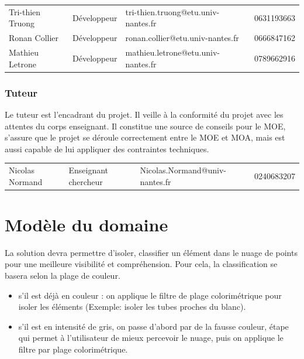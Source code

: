 \documentclass[12pt,titlepage,french]{article}
\begin{document}
\noindent\begin{tabu} to \textwidth {X[c2]X[c]X[c3]X[c]}\toprule
     &&                       &\\\toprule
Tri-thien Truong& Développeur&tri-thien.truong@etu.univ-nantes.fr&    0631193663\\\midrule
   Ronan Collier& Développeur&   ronan.collier@etu.univ-nantes.fr&    0666847162\\\midrule
 Mathieu Letrone& Développeur& mathieu.letrone@etu.univ-nantes.fr&    0789662916\\\bottomrule
\end{tabu}


\subsubsection*{Tuteur}

Le tuteur est l'encadrant du projet. Il veille à la conformité du projet avec les attentes du corps enseignant.
Il constitue une source de conseils pour le MOE, s'assure que le projet se déroule correctement entre le MOE et MOA, mais est aussi capable de lui appliquer des contraintes techniques.\\ 

\noindent\begin{tabu} to \textwidth {X[c2]X[c2]X[c3]X[c]}\toprule
     &&                       &\\\toprule
Nicolas Normand& Enseignant chercheur&Nicolas.Normand@univ-nantes.fr&    0240683207\\\bottomrule
\end{tabu}


\section{Modèle du domaine}

La solution devra permettre d’isoler, classifier un élément dans le nuage de points pour une meilleure visibilité et compréhension. Pour cela, la classification se basera selon la plage de couleur.
\begin{itemize}
	\item  s'il est déjà en couleur : on applique le filtre de plage colorimétrique pour isoler les éléments (Exemple: isoler les tubes proches du blanc).\par

	\item  s'il est en intensité de gris, on passe d'abord par de la fausse couleur, étape qui permet à l'utilisateur de mieux percevoir le nuage, puis on applique le filtre par plage colorimétrique.\par

\end{itemize}
\end{document}
